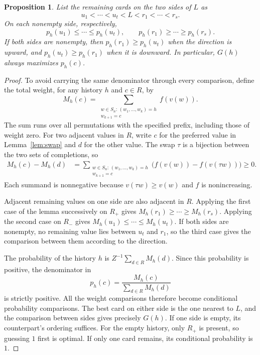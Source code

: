 \documentclass[11pt,reqno]{amsart}
\numberwithin{equation}{section}
\newtheorem{proposition}[theorem]{Proposition}
\theoremstyle{definition}
\theoremstyle{remark}
\begin{document}
\begin{proposition}\label{prop:ordering}
List the remaining cards on the two sides of $L$ as
\[
 u_1<\cdots<u_t<L<r_1<\cdots<r_s.
\]
On each nonempty side, respectively,
\begin{equation}\label{eq:side-order}
 p_h(u_1)\le\cdots\le p_h(u_t),\qquad
 p_h(r_1)\ge\cdots\ge p_h(r_s).
\end{equation}
If both sides are nonempty, then $p_h(r_1)\ge p_h(u_t)$ when the direction is upward, and $p_h(u_t)\ge p_h(r_1)$ when it is downward. In particular, $G(h)$ always maximizes $p_h(c)$.
\end{proposition}
\begin{proof}
To avoid carrying the same denominator through every comparison, define the total weight, for any history $h$ and $c\in R$, by
\[
 M_h(c)=\sum_{\substack{w\in S_n:\,(w_1,\ldots,w_k)=h\\ w_{k+1}=c}}f(v(w)).
\]
The sum runs over all permutations with the specified prefix, including those of weight zero. For two adjacent values in $R$, write $c$ for the preferred value in Lemma~\ref{lem:swap} and $d$ for the other value. The swap $\tau$ is a bijection between the two sets of completions, so
\begin{align}
 M_h(c)-M_h(d)
 &=\sum_{\substack{w\in S_n:\,(w_1,\ldots,w_k)=h\\ w_{k+1}=c}}
 \bigl(f(v(w))-f(v(\tau w))\bigr)\ge0.\label{eq:weight-difference}
\end{align}
Each summand is nonnegative because $v(\tau w)\ge v(w)$ and $f$ is nonincreasing.

Adjacent remaining values on one side are also adjacent in $R$. Applying the first case of the lemma successively on $R_+$ gives $M_h(r_1)\ge\cdots\ge M_h(r_s)$. Applying the second case on $R_-$ gives $M_h(u_1)\le\cdots\le M_h(u_t)$. If both sides are nonempty, no remaining value lies between $u_t$ and $r_1$, so the third case gives the comparison between them according to the direction.

The probability of the history $h$ is $Z^{-1}\sum_{d\in R}M_h(d)$. Since this probability is positive, the denominator in
\begin{equation}\label{eq:conditional}
 p_h(c)=\frac{M_h(c)}{\sum_{d\in R}M_h(d)}
\end{equation}
is strictly positive. All the weight comparisons therefore become conditional probability comparisons. The best card on either side is the one nearest to $L$, and the comparison between sides gives precisely $G(h)$. If one side is empty, its counterpart's ordering suffices. For the empty history, only $R_+$ is present, so guessing $1$ first is optimal. If only one card remains, its conditional probability is $1$.
\end{proof}
\end{document}
